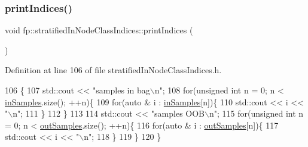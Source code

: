 \subsubsection{\texorpdfstring{print\+Indices()}{printIndices()}}
{\footnotesize\ttfamily void fp\+::stratified\+In\+Node\+Class\+Indices\+::print\+Indices (\begin{DoxyParamCaption}{ }\end{DoxyParamCaption})\hspace{0.3cm}{\ttfamily [inline]}}



Definition at line 106 of file stratified\+In\+Node\+Class\+Indices.\+h.


\begin{DoxyCode}
106                                \{
107                 std::cout << \textcolor{stringliteral}{"samples in bag\(\backslash\)n"};
108                 \textcolor{keywordflow}{for}(\textcolor{keywordtype}{unsigned} \textcolor{keywordtype}{int} n = 0; n < \hyperlink{classfp_1_1stratifiedInNodeClassIndices_a6bfa636c77b48163f5d245959ea753d0}{inSamples}.size(); ++n)\{
109                     \textcolor{keywordflow}{for}(\textcolor{keyword}{auto} & i : \hyperlink{classfp_1_1stratifiedInNodeClassIndices_a6bfa636c77b48163f5d245959ea753d0}{inSamples}[n])\{
110                         std::cout << i << \textcolor{stringliteral}{"\(\backslash\)n"};
111                     \}
112                 \}
113 
114                 std::cout << \textcolor{stringliteral}{"samples OOB\(\backslash\)n"};
115                 \textcolor{keywordflow}{for}(\textcolor{keywordtype}{unsigned} \textcolor{keywordtype}{int} n = 0; n < \hyperlink{classfp_1_1stratifiedInNodeClassIndices_aa569f727e65e0b4b0815e71c1ee819e8}{outSamples}.size(); ++n)\{
116                     \textcolor{keywordflow}{for}(\textcolor{keyword}{auto} & i : \hyperlink{classfp_1_1stratifiedInNodeClassIndices_aa569f727e65e0b4b0815e71c1ee819e8}{outSamples}[n])\{
117                         std::cout << i << \textcolor{stringliteral}{"\(\backslash\)n"};
118                     \}
119                 \}
120             \}
\end{DoxyCode}
\mbox{\label{classfp_1_1stratifiedInNodeClassIndices_a775d9a820b6f48ab44cd1ac4ffde1578}} 
